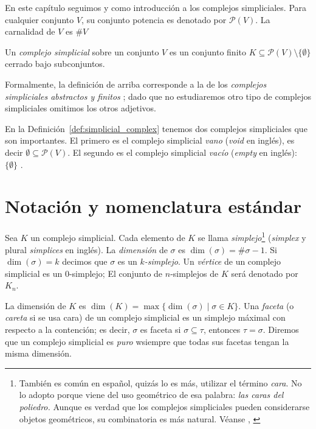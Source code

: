 \documentclass{standalone}
\begin{document}
	En este capítulo seguimos \cite{alberto:2023} y \cite{kozlov:2008:combinatorial:alg:topo} como introducción a los complejos simpliciales.
	\noindent Para cualquier conjunto $V$, su conjunto potencia es denotado por $\mathcal{P}(V)$. La carnalidad de $V$ es $\# V$
	
	\begin{definition}\label{def:simplicial_complex}
		Un \emph{complejo simplicial} sobre un conjunto $V$ es un conjunto finito $K\subseteq\mathcal{P}(V)\setminus\{\emptyset\}$ cerrado bajo subconjuntos.
	\end{definition}
	
	Formalmente, la definición de arriba corresponde a la de los \emph{complejos simpliciales abstractos y finitos} \cite[Definition 2.1]{kozlov:2008:combinatorial:alg:topo}; dado que no estudiaremos otro tipo de complejos simpliciales omitimos los otros adjetivos. 
	
	\begin{remark}\label{rem:empty_complexes}
		En la Definición~\ref{def:simplicial_complex} tenemos dos complejos simpliciales que son importantes. El primero es el complejo simplicial \emph{vano} (\emph{void} en inglés), es decir $\emptyset\subseteq\mathcal{P}(V)$. El segundo es el complejo simplicial \emph{vacío} (\emph{empty} en inglés): $\{\emptyset\}$ \cite[Remark 2.3]{kozlov:2008:combinatorial:alg:topo}. 
	\end{remark}
	
	\section{Notación y nomenclatura estándar}
	
	\noindent Sea $K$ un complejo simplicial. Cada elemento de $K$ se llama \emph{simplejo}\footnote{También es común en español, quizás lo es más, utilizar el término \emph{cara}. No lo adopto porque viene del uso geométrico de esa palabra: \textit{las caras del poliedro.} Aunque es verdad que los complejos simpliciales pueden considerarse objetos geométricos, su combinatoria es más natural. Véanse \cite{kozlov:2008:combinatorial:alg:topo}, \cite{may:1967:simplicial}} (\emph{simplex} y plural \emph{simplices} en inglés). La \emph{dimensión} de $\sigma$ es $\dim(\sigma)=\#\sigma-1$. Si $\dim(\sigma)=k$ decimos que $\sigma$ es un \emph{$k$-simplejo}. Un \emph{vértice} de un complejo simplicial es un $0$-simplejo; El conjunto de  $n$-simplejos de $K$ será denotado por $K_{n}$. 
	
	La dimensión de $K$ es $\dim(K)=\max\{\dim(\sigma)\mid\sigma\in K\}$. Una \emph{faceta} (o \emph{careta} si se usa cara) de un complejo simplicial es un simplejo máximal con respecto a la contención; es decir, $\sigma$ es faceta si $\sigma\subseteq\tau$, entonces $\tau=\sigma$. Diremos que un complejo simplicial es \emph{puro} wsiempre que todas sus facetas tengan la misma dimensión.
	
\end{document}
